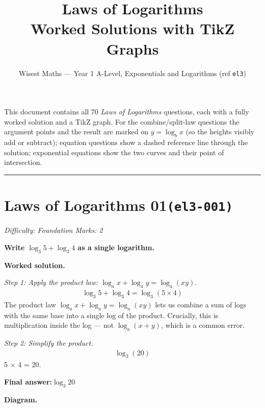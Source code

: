 \documentclass[11pt]{article}
\title{\textbf{Laws of Logarithms}\\[0.3em]\large Worked Solutions with TikZ Graphs}
\author{Wisest Maths --- Year 1 A-Level, Exponentials and Logarithms (ref \texttt{el3})}
\date{}
\newcommand{\question}[1]{\par\medskip\noindent\textbf{#1}\par}
\begin{document}
\maketitle
\noindent This document contains all 70 \emph{Laws of Logarithms} questions, each with a fully
worked solution and a TikZ graph. For the combine/split-law questions the argument points and the result are
marked on \(y=\log_b x\) (so the heights visibly add or subtract); equation questions show a dashed reference
line through the solution; exponential equations show the two curves and their point of intersection.
\tableofcontents
\bigskip
\hrule

\section*{Laws of Logarithms 01\quad\small\texttt{(el3-001)}}
\textit{Difficulty: Foundation \quad\textbar\quad Marks: 2}

\question{Write \( \log_3 5 + \log_3 4 \) as a single logarithm.}

\textbf{Worked solution.}

\textit{Step 1: Apply the product law: \( \log_a x + \log_a y = \log_a(xy) \).}
\[\begin{gathered}
\log_3 5 + \log_3 4 = \log_3(5 \times 4)
\end{gathered}\]
The product law \( \log_a x + \log_a y = \log_a(xy) \) lets us combine a sum of logs with the same base into a single log of the product. Crucially, this is multiplication inside the log --- not \( \log_a(x+y) \), which is a common error.

\textit{Step 2: Simplify the product.}
\[\begin{gathered}
\log_3(20)
\end{gathered}\]
5 $\times$ 4 = 20.

\begin{answerbox}
\textbf{Final answer:}\quad \(\displaystyle  \log_3 20 \)
\end{answerbox}
\textbf{Diagram.}
\end{document}
